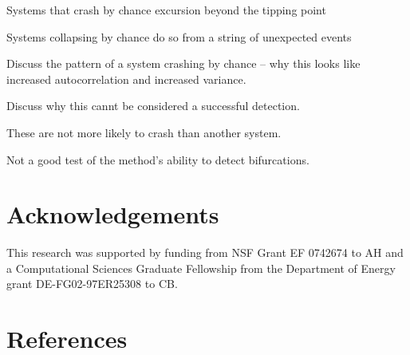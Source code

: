 \documentclass[authoryear,review,12pt]{elsarticle}
\begin{document}
Systems that crash by chance excursion beyond the tipping point 

Systems collapsing by chance do so from a string of unexpected events 

Discuss the pattern of a system crashing by chance -- why this looks like increased autocorrelation and increased variance.  
 
Discuss why this cannt be considered a successful detection.  

These are not more likely to crash than another system.  

Not a good test of the method's ability to detect bifurcations.  

 \section{Acknowledgements}
This research was supported by funding from NSF Grant EF 0742674 to AH
and a Computational Sciences Graduate Fellowship from the Department of Energy grant DE-FG02-97ER25308 to CB. 
 \section{References}%
 
 
\end{document}
